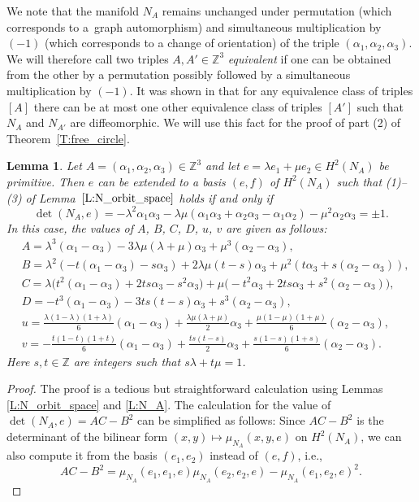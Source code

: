 \documentclass[10pt,a4paper]{amsart}
\numberwithin{equation}{section}
\newtheorem{Lemma}[Theorem]{Lemma}
\theoremstyle{definition}
\numberwithin{table}{section}
\newcommand{\Z}{\mathbb{Z}}
\begin{document}
We note that the manifold $N_A$ remains unchanged under permutation (which corresponds to a~graph automorphism) and simultaneous multiplication by $(-1)$ (which corresponds to a change of orientation) of the triple $(\alpha_1,\alpha_2,\alpha_3)$. We will therefore call two triples $A,A'\in\Z^3$ \emph{equivalent} if one can be obtained from the other by a permutation possibly followed by a simultaneous multiplication by $(-1)$. It was shown in \cite[Proposition 4.12]{Re24b} that for any equivalence class of triples $[A]$ there can be at most one other equivalence class of triples $[A']$ such that $N_A$ and $N_{A'}$ are diffeomorphic. We will use this fact for the proof of part (2) of Theorem~\ref{T:free_circle}.


\begin{Lemma}\label{L:N_A_inv}
	Let $A=(\alpha_1,\alpha_2,\alpha_3)\in\Z^3$ and let $e=\lambda e_1+\mu e_2\in H^2(N_A)$ be primitive. Then $e$ can be extended to a basis $(e,f)$ of $H^2(N_A)$ such that {\rm (1)--(3)} of Lemma~$\ref{L:N_orbit_space}$ holds if and only if
	\[ \det(N_A,e)=-\lambda^2\alpha_1\alpha_3-\lambda\mu(\alpha_1\alpha_3+\alpha_2\alpha_3-\alpha_1\alpha_2)-\mu^2\alpha_2\alpha_3=\pm1. \]
	In this case, the values of $A$, $B$, $C$, $D$, $u$, $v$ are given as follows:
	\begin{align*}
		&A=\lambda^3(\alpha_1-\alpha_3)-3\lambda\mu(\lambda+\mu)\alpha_3+\mu^3(\alpha_2-\alpha_3),\\
		&B=\lambda^2(-t(\alpha_1-\alpha_3)-s\alpha_3)+2\lambda\mu(t-s)\alpha_3+\mu^2(t\alpha_3+s(\alpha_2-\alpha_3)),\\
		&C=\lambda\bigl(t^2(\alpha_1-\alpha_3)+2ts\alpha_3-s^2\alpha_3\bigr)+\mu\bigl(-t^2\alpha_3+2ts\alpha_3+s^2(\alpha_2-\alpha_3)\bigr),\\
		&D=-t^3(\alpha_1-\alpha_3)-3ts(t-s)\alpha_3+s^3(\alpha_2-\alpha_3),\\
		&u=\frac{\lambda(1-\lambda)(1+\lambda)}{6}(\alpha_1-\alpha_3)+\frac{\lambda\mu(\lambda+\mu)}{2}\alpha_3+\frac{\mu(1-\mu)(1+\mu)}{6}(\alpha_2-\alpha_3),\\
		&v=-\frac{t(1-t)(1+t)}{6}(\alpha_1-\alpha_3)+\frac{ts(t-s)}{2}\alpha_3+\frac{s(1-s)(1+s)}{6}(\alpha_2-\alpha_3).
	\end{align*}
	Here $s,t\in\Z$ are integers such that $s\lambda+t\mu=1$.
\end{Lemma}
\begin{proof}
	The proof is a tedious but straightforward calculation using Lemmas \ref{L:N_orbit_space} and \ref{L:N_A}. The calculation for the value of $\det(N_A,e)=AC-B^2$ can be simplified as follows: Since $AC-B^2$ is the determinant of the bilinear form $(x,y)\mapsto \mu_{N_A}(x,y,e)$ on $H^2(N_A)$, we can also compute it from the basis $(e_1,e_2)$ instead of $(e,f)$, i.e.,
\[
 AC-B^2=\mu_{N_A}(e_1,e_1,e)\mu_{N_A}(e_2,e_2,e)-\mu_{N_A}(e_1,e_2,e)^2. \tag*{\qed}
\]
\renewcommand{\qed}{}
\end{proof}
\end{document}
